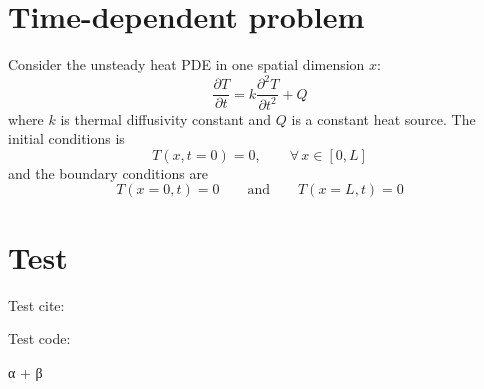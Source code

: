 \documentclass[a4paper,12pt]{article} %
\begin{document}
\section{Time-dependent problem}

Consider the unsteady heat PDE in one spatial dimension $x$:
\begin{equation}
\frac{\partial T}{\partial t} = k \frac{\partial^2 T}{\partial t^2} + Q
\end{equation}
where $k$ is thermal diffusivity constant and $Q$ is a constant heat source.
%
The initial conditions is
\begin{equation}
T(x,t=0) = 0,\qquad \forall \, x \in [0,L]
\end{equation}
and the boundary conditions are
\begin{equation}
T(x=0,t) = 0 \qquad \text{and} \qquad T(x=L,t) = 0
\end{equation}


\section{Test}

Test cite: \cite{Heinrich2017}

Test code:
\begin{juliacode}
α + β
\end{juliacode}



\end{document}

